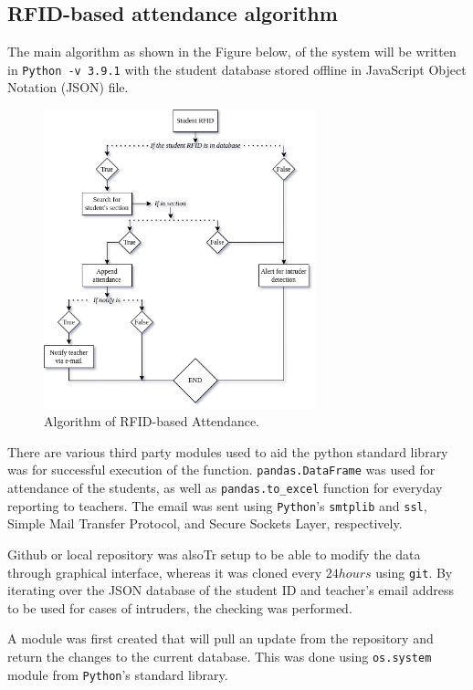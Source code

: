 \documentclass{article}
\begin{document}
\subsection*{RFID-based attendance algorithm}

The main algorithm as shown in the Figure below, of the system will be written in \texttt{Python -v 3.9.1} with the student database stored offline in JavaScript Object Notation (JSON) file.

\begin{figure}[h!]
    \centering
    \includegraphics[width=0.7\textwidth]{fig1.png}
    \caption{Algorithm of RFID-based Attendance.} \label{fig:1}
\end{figure}

There are various third party modules used to aid the python standard library was for successful execution of the function. \texttt{pandas.DataFrame} was used for attendance of the students, as well as \texttt{pandas.to\_excel} function for everyday reporting to teachers. The email was sent using \texttt{Python}'s \texttt{smtplib} and \texttt{ssl}, Simple Mail Transfer Protocol, and Secure Sockets Layer, respectively.

Github or local repository was alsoTr setup to be able to modify the data through graphical interface, whereas it was cloned every $24 hours$ using \texttt{git}. By iterating over the JSON database of the student ID and teacher's email address to be used for cases of intruders, the checking was performed.

A module was first created that will pull an update from the repository and return the changes to the current database. This was done using \texttt{os.system} module from \texttt{Python}'s standard library.
\end{document}
